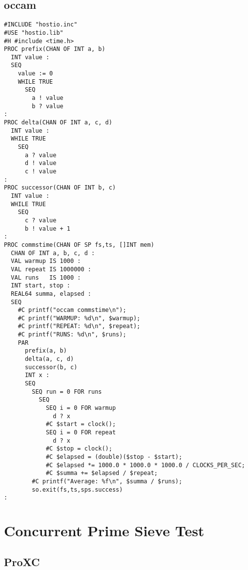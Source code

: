 \subsection*{occam}

\begin{lstlisting}[caption={Commstime code for occam},style={CustomOccam}]
#INCLUDE "hostio.inc"
#USE "hostio.lib"
#H #include <time.h>
PROC prefix(CHAN OF INT a, b)
  INT value :
  SEQ
    value := 0
    WHILE TRUE
      SEQ
        a ! value
        b ? value
:
PROC delta(CHAN OF INT a, c, d)
  INT value :
  WHILE TRUE
    SEQ
      a ? value
      d ! value
      c ! value
:
PROC successor(CHAN OF INT b, c)
  INT value :
  WHILE TRUE
    SEQ
      c ? value
      b ! value + 1 
:
PROC commstime(CHAN OF SP fs,ts, []INT mem)
  CHAN OF INT a, b, c, d :
  VAL warmup IS 1000 :
  VAL repeat IS 1000000 :
  VAL runs   IS 1000 :
  INT start, stop :
  REAL64 summa, elapsed :
  SEQ
    #C printf("occam commstime\n");
    #C printf("WARMUP: %d\n", $warmup);
    #C printf("REPEAT: %d\n", $repeat);
    #C printf("RUNS: %d\n", $runs);
    PAR
      prefix(a, b)
      delta(a, c, d)
      successor(b, c)
      INT x :
      SEQ
        SEQ run = 0 FOR runs
          SEQ
            SEQ i = 0 FOR warmup
              d ? x
            #C $start = clock();
            SEQ i = 0 FOR repeat
              d ? x
            #C $stop = clock();
            #C $elapsed = (double)($stop - $start);
            #C $elapsed *= 1000.0 * 1000.0 * 1000.0 / CLOCKS_PER_SEC; 
            #C $summa += $elapsed / $repeat;
        #C printf("Average: %f\n", $summa / $runs);
        so.exit(fs,ts,sps.success)
:
\end{lstlisting}

\section*{Concurrent Prime Sieve Test}

\subsection*{ProXC}

